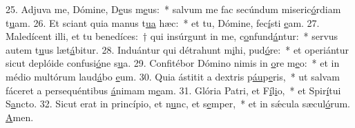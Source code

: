 25. Adjuva me, Dómine, D\uline{e}us m\uline{e}us:~* salvum me fac secúndum miseric\uline{ó}rdiam t\uline{u}am.
26. Et sciant quia manus t\uline{u}\uline{a} hæc:~* et tu, Dómine, fec\uline{í}sti \uline{e}am.
27. Maledícent illi, et tu benedíces:~† qui insúrgunt in me, c\uline{o}nfund\uline{á}ntur:~* servus autem t\uline{u}us læt\uline{á}bitur.
28. Induántur qui détrahunt m\uline{i}hi, pud\uline{ó}re:~* et operiántur sicut deplóide confusi\uline{ó}ne s\uline{u}a.
29. Confitébor Dómino nimis in \uline{o}re m\uline{e}o:~* et in médio multórum laud\uline{á}bo \uline{e}um.
30. Quia ástitit a dextris p\uline{áu}p\uline{e}ris,~* ut salvam fáceret a persequéntibus \uline{á}nimam m\uline{e}am.
31. Glória Patri, et F\uline{í}l\uline{i}o,~* et Spir\uline{í}tui S\uline{a}ncto.
32. Sicut erat in princípio, et n\uline{u}nc, et s\uline{e}mper,~* et in sǽcula sæcul\uline{ó}rum. \uline{A}men.
